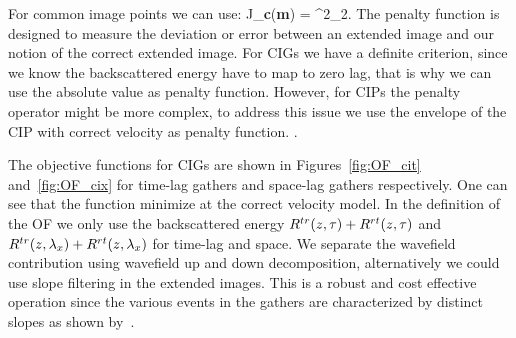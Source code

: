 For common image points we can use:
\beq
J_{\bf c}({\bf m}) =   ^2_2.
\eeq
%
The penalty function is designed to measure the deviation or error between an extended image and our notion of the correct 
extended image. For CIGs we have a definite criterion, since we know the backscattered energy have to map
to zero lag, that is why we can use the absolute value as penalty function. However, for CIPs the 
penalty operator might be more complex, to address this issue we use the envelope of the 
CIP with correct velocity as penalty function. .


The objective functions for CIGs are shown in Figures~\ref{fig:OF_cit} and~\ref{fig:OF_cix} for time-lag gathers
and space-lag gathers respectively. One can see that the function minimize at the correct velocity model. In the definition 
of the OF we only use the backscattered energy $R^{tr}(z,\tau)+R^{rt}(z,\tau)$ and $R^{tr}(z,\lambda_x)+R^{rt}(z,\lambda_x)$ for time-lag and space. We separate the wavefield contribution using
wavefield up and down decomposition, alternatively we could use slope filtering in the extended images. This is a 
robust and cost effective operation since the various events in the gathers are characterized
by distinct slopes as shown by~\cite{kaelin:3125}.
